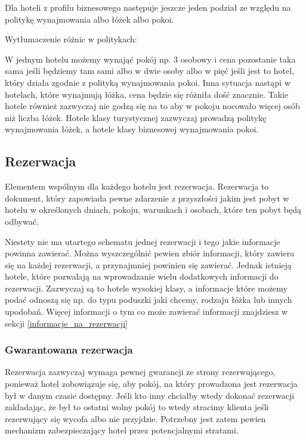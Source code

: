\documentclass[a4paper,onecolumn,oneside,11pt,wide,floatssmall]{mwrep}
\theoremstyle{definition}
\theoremstyle{plain}%
\theoremstyle{remark}
\begin{document}
  Dla hoteli z profilu biznesowego następuje 
 jeszcze jeden podział ze względu na politykę wynajmowania albo łóżek albo pokoi.
   
 Wytłumaczenie różnic w politykach:
 
 W jednym hotelu możemy wynająć pokój np.
 3 osobowy i cena pozostanie taka sama jeśli będziemy tam sami albo w dwie osoby albo w pięć jeśli jest to hotel,
  który działa zgodnie z polityką wynajmowania pokoi. Inna sytuacja nastąpi w hotelach, które wynajmują łóżka,
   cena będzie się różniła dość znacznie. Takie hotele również
   zazwyczaj nie godzą się na to aby w pokoju nocowało więcej osób niż liczba łóżek. 
   Hotele klasy turystycznej zazwyczaj prowadzą politykę wynajmowania łóżek, a hotele klasy biznesowej wynajmowania pokoi.

\subsection{Rezerwacja}
Elementem wspólnym dla każdego hotelu jest rezerwacja.
Rezerwacja to dokument, który zapowiada pewne zdarzenie
z przyszłości jakim jest pobyt w hotelu w określonych dniach,
pokoju, warunkach i osobach, które ten pobyt będą odbywać.

Niestety nie ma utartego schematu jednej rezerwacji i tego jakie informacje
powinna zawierać. Można wyszczególnić pewien zbiór informacji, który zawiera się
na każdej rezerwacji, a przynajmniej powinien się zawierać. Jednak istnieją
hotele, które pozwalają na wprowadzanie wielu dodatkowych informacji do
rezerwacji. Zazwyczaj są to hotele wysokiej klasy, a informacje które możemy
podać odnoszą się np. do typu poduszki jaki chcemy, rodzaju łóżka lub innych
upodobań. Więcej informacji o tym co może zawierać informacji znajdziesz w
sekcji \ref{informacje_na_rezerwacji}


\subsubsection{Gwarantowana rezerwacja}
Rezerwacja zazwyczaj wymaga pewnej gwarancji ze strony rezerwującego, ponieważ
hotel zobowiązuje się, aby pokój, na który prowadzona jest rezerwacja
był w danym czasie dostępny. Jeśli kto inny chciałby wtedy dokonać rezerwacji 
zakładając, że był to ostatni wolny pokój to wtedy stracimy klienta jeśli 
rezerwujący się wycofa albo nie przyjdzie. Potrzebny jest zatem pewien  
mechanizm zabezpieczający hotel przez potencjalnymi stratami. 
\end{document}

